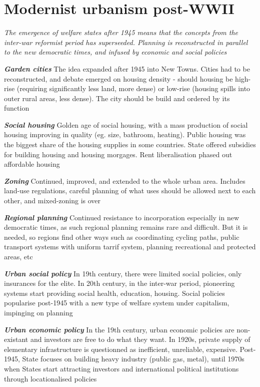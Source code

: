 \documentclass{article}
\newcommand{\bisection}[1]{\textbf{\textit{#1}}}
\newcommand{\alignedmarginpar}[1]{%
        \marginpar{\raggedright\small #1}
    }
\begin{document}
\pagebreak
\section{Modernist urbanism post-WWII}

\textit{The emergence of welfare states after 1945 means that the concepts from the inter-war reformist period has superseeded. Planning is reconstructed in parallel to the new democratic times, and infused by economic and social policies}

\bisection{Garden cities} The idea expanded after 1945 into New Towns. Cities had to be reconstructed, and debate emerged on housing density - should housing be high-rise (requiring significantly less land, more dense) or low-rise (housing spills into outer rural areas, less dense). The city should be build and ordered by its function

\bisection{Social housing} Golden age of social housing, with a mass production of social housing improving in quality (eg. size, bathroom, heating). Public housing was the biggest share of the housing supplies in some countries. State offered subsidies for building housing and housing morgages. Rent liberalisation phased out affordable housing

\bisection{Zoning} Continued, improved, and extended to the whole urban area. Includes land-use regulations, careful planning of what uses should be allowed next to each other, and mixed-zoning is over

\bisection{Regional planning} Continued resistance to incorporation especially in new democratic times, as such regional planning remains rare and difficult. But it is needed, so regions find other ways such as coordinating cycling paths, public transport systems with uniform tarrif system, planning recreational and protected areas, etc

\bisection{Urban social policy} In 19th century, there were limited social policies, only insurances for the elite. In 20th century, in the inter-war period, pioneering systems start providing social health, education, housing. Social policies popularise post-1945 with a new type of welfare system under capitalism, impinging on planning

\bisection{Urban economic policy} In the 19th century, urban economic policies are non-existant and investors are free to do what they want. In 1920s, private supply of elementary infrastructure is questionned as inefficient, unreliable, expensive. Post-1945, State focuses on building heavy industry (public gas, metal), until 1970s when States start attracting investors and international political institutions through locationalised policies\alignedmarginpar{UN City Vienna}
\end{document}
